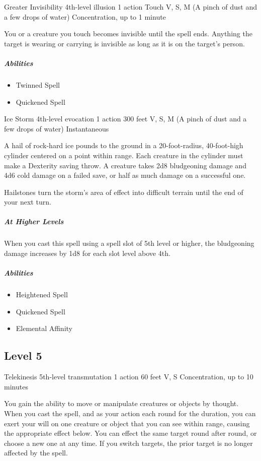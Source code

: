 \documentclass[a4paper,openany,twocolumn]{book}
\begin{document}
\DndSpellHeader
  {Greater Invisibility}
  {4th-level illusion}
  {1 action}
  {Touch}
  {V, S, M (A pinch of dust and a few drops of water)}
  {Concentration, up to 1 minute}

You or a creature you touch becomes invisible until the spell ends. Anything the target is wearing or carrying is invisible as long as it is on the target's person.

\subparagraph*{Abilities}
\begin{itemize}
  \item Twinned Spell
  \item Quickened Spell
\end{itemize}

\DndSpellHeader
  {Ice Storm}
  {4th-level evocation}
  {1 action}
  {300 feet}
  {V, S, M (A pinch of dust and a few drops of water)}
  {Instantaneous}

A hail of rock-hard ice pounds to the ground in a 20-foot-radius, 40-foot-high cylinder centered on a point within range.  Each creature in the cylinder must make a Dexterity saving throw. A creature takes 2d8 bludgeoning damage and 4d6 cold damage on a failed save, or half as much damage on a successful one.
    
Hailstones turn the storm's area of effect into difficult terrain until the end  of your next turn.
    
\subparagraph*{At Higher Levels} When you cast this spell using a spell slot of 5th level or higher, the bludgeoning damage increases by 1d8 for each slot level above 4th.

\subparagraph*{Abilities}
\begin{itemize}
  \item Heightened Spell
  \item Quickened Spell
  \item Elemental Affinity
\end{itemize}


\subsection*{Level 5}

\DndSpellHeader
  {Telekinesis}
  {5th-level transmutation}
  {1 action}
  {60 feet}
  {V, S}
  {Concentration, up to 10 minutes}

You gain the ability to move or manipulate creatures or objects by thought. When you cast the spell, and as your action each round for the duration, you can exert your will on one creature or object that you can see within range, causing the appropriate effect below. You can effect the same target round after round, or choose a new one at any time. If you switch targets, the prior target is no longer affected by the spell.
\end{document}
